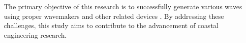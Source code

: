 The primary objective of this research is to successfully generate various waves using proper wavemakers and other related devices \cite{o2017methods}. By addressing these challenges, this study aims to contribute to the advancement of coastal engineering research.






